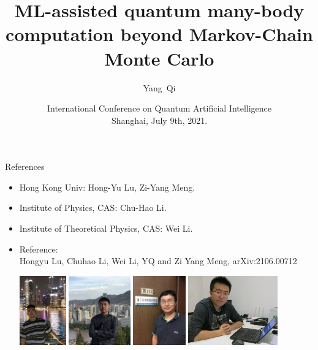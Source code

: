 \documentclass[xcolor=table, 10pt, aspectratio=169, ignorenonframetext]{beamer}
\title[CNNMC] %
{ML-assisted quantum many-body computation beyond Markov-Chain Monte Carlo}
\author[Y Qi] %
{Yang~Qi}
\institute[Fudan] %
{Department of Physics, Fudan University}
\date{International Conference on Quantum Artificial Intelligence\\Shanghai, July 9th, 2021.}
\begin{document}
\begin{frame}
  \titlepage
\end{frame}

\begin{frame}{References}
\begin{itemize}
\item Hong Kong Univ: Hong-Yu Lu, Zi-Yang Meng.
\item Institute of Physics, CAS: Chu-Hao Li.
\item Institute of Theoretical Physics, CAS: Wei Li.
\item Reference:\\
Hongyu Lu, Chuhao Li, Wei Li, YQ and Zi Yang Meng, arXiv:2106.00712
\begin{center}
  \includegraphics[height=3cm]{../people/hongyulu}
  \includegraphics[height=3cm]{../people/chuhaoli}
  \includegraphics[height=3cm]{../people/weili}
  \includegraphics[height=3cm]{../people/ziyangmeng}
\end{center}
\end{itemize}
\end{frame}
\end{document}
